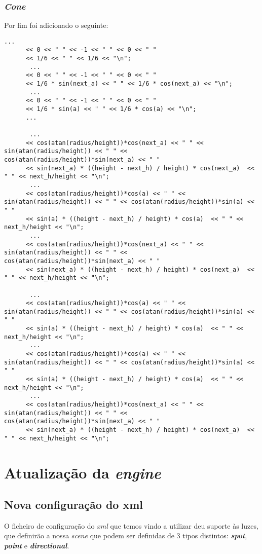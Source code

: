 \documentclass[11pt,a4paper]{report}
\begin{document}
\subsection{\emph{Cone}}
Por fim foi adicionado o seguinte:
\begin{multicols}{2}
\begin{lstlisting}[style = code]
       ...
      << 0 << " " << -1 << " " << 0 << " "
      << 1/6 << " " << 1/6 << "\n";
       ...
      << 0 << " " << -1 << " " << 0 << " "
      << 1/6 * sin(next_a) << " " << 1/6 * cos(next_a) << "\n";
       ...
      << 0 << " " << -1 << " " << 0 << " "
      << 1/6 * sin(a) << " " << 1/6 * cos(a) << "\n";
      ...

       ...
      << cos(atan(radius/height))*cos(next_a) << " " << sin(atan(radius/height)) << " " << cos(atan(radius/height))*sin(next_a) << " "
      << sin(next_a) * ((height - next_h) / height) * cos(next_a)  << " " << next_h/height << "\n";
       ...
      << cos(atan(radius/height))*cos(a) << " " << sin(atan(radius/height)) << " " << cos(atan(radius/height))*sin(a) << " "
      << sin(a) * ((height - next_h) / height) * cos(a)  << " " << next_h/height << "\n";
       ...
      << cos(atan(radius/height))*cos(next_a) << " " << sin(atan(radius/height)) << " " << cos(atan(radius/height))*sin(next_a) << " "
      << sin(next_a) * ((height - next_h) / height) * cos(next_a)  << " " << next_h/height << "\n";

       ...
      << cos(atan(radius/height))*cos(a) << " " << sin(atan(radius/height)) << " " << cos(atan(radius/height))*sin(a) << " "
      << sin(a) * ((height - next_h) / height) * cos(a)  << " " << next_h/height << "\n";
       ...
      << cos(atan(radius/height))*cos(a) << " " << sin(atan(radius/height)) << " " << cos(atan(radius/height))*sin(a) << " "
      << sin(a) * ((height - next_h) / height) * cos(a)  << " " << next_h/height << "\n";
       ...
      << cos(atan(radius/height))*cos(next_a) << " " << sin(atan(radius/height)) << " " << cos(atan(radius/height))*sin(next_a) << " "
      << sin(next_a) * ((height - next_h) / height) * cos(next_a)  << " " << next_h/height << "\n";  
\end{lstlisting}
\end{multicols}

\chapter{Atualização da \emph{engine}}

\section{Nova configuração do xml}
O ficheiro de configuração do \emph{xml} que temos vindo a utilizar deu suporte às luzes, que definirão a nossa \emph{scene} que podem ser definidas de 3 tipos distintos: \textbf{\emph{spot}}, \textbf{ \emph{point}} e \textbf{\emph{directional}}.
\end{document}
